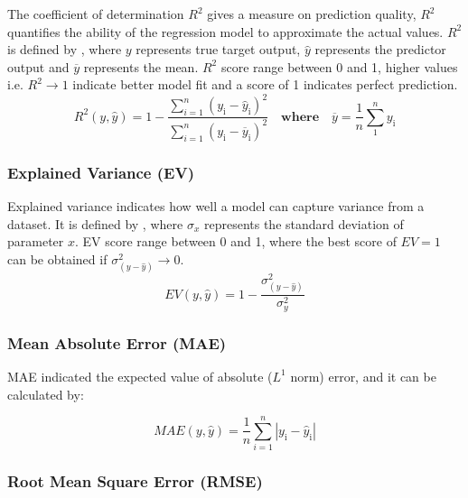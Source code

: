 The coefficient of determination $R^2$ gives a measure on prediction quality, $R^2$ quantifies the ability of the regression model to approximate the actual values. $R^2 $ is defined by , where $y$ represents true target output, $\hat{y}$ represents the predictor output and $\overline{y}$ represents the mean. $R^2$ score range between 0 and 1, higher values i.e. $R^2 \rightarrow 1$ indicate better model fit and a score of 1 indicates perfect prediction.\\

\begin{equation}\label{eqn:rsquared}
    R^2(y,\hat{y}) = 1 - \frac{\sum_{i = 1}^{n} (y_{\text{i}} - \hat{y}_{\text{i}} )^2 }{\sum_{i = 1}^{n} (y_{\text{i}} - \overline{y}_{\text{i}})^2} \quad \textbf{where} \quad \overline{y} = \frac{1}{n}\sum_{1}^{n} y_\text{i}
\end{equation}

\subsubsection*{Explained Variance (EV)}\label{sec:expVar}

Explained variance indicates how well a model can capture variance from a dataset. It is defined by , where $\sigma_x$ represents the standard deviation of parameter $x$. EV score range between 0 and 1, where the best score of $EV = 1$ can be obtained if $\sigma^2_{(y-\hat{y})} \rightarrow 0$.\\  

\begin{equation}\label{eqn:expVar}
    EV(y,\hat{y}) = 1 - \frac{\sigma^2_{(y-\hat{y})}}{\sigma^2_{y}}
\end{equation}

\subsubsection*{Mean Absolute Error (MAE)}\label{sec:MAE}

MAE indicated the expected value of absolute ($L^1$ norm) error, and it can be calculated by:

\begin{equation}\label{eqn:MAE}
    MAE(y,\hat{y}) = \frac{1}{n}\sum_{i=1}^{n} |y_{\text{i}} - \hat{y}_{\text{i}}| 
\end{equation}

\subsubsection*{Root Mean Square Error (RMSE)}\label{sec:RMSE}

